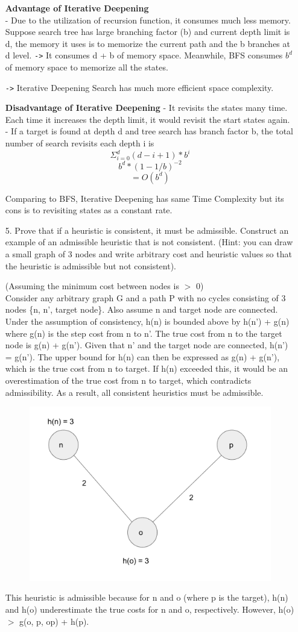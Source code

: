 \documentclass{article}
\begin{document}
\begin{enumerate}
\textbf{Advantage of Iterative Deepening}\\
- Due to the utilization of recursion function, it consumes much less memory.
Suppose search tree has large branching factor (b) and current depth limit is d, the memory it uses is to memorize the current path and the b branches at d level.
\verb|->| It consumes d + b of memory space.
Meanwhile, BFS consumes $b^d$ of memory space to memorize all the states.

\verb|->| Iterative Deepening Search has much more efficient space complexity.

\textbf{Disadvantage of Iterative Deepening}
- It revisits the states many time. Each time it increases the depth limit, it would revisit the start states again.\\
- If a target is found at depth d and tree search has branch factor b, the total number of search revisits each depth i is 
\[ \Sigma_{i=0}^d (d-i+1) \ast b^i \]
\[ b^d \ast (1 - 1/b)^{-2} \]
\[ = O(b^d)\]

Comparing to BFS, Iterative Deepening has same Time Complexity but its cons is to revisiting states as a constant rate.

\item[5.]
Prove that if a heuristic is consistent, it must be admissible. Construct an example of an admissible
heuristic that is not consistent. (Hint: you can draw a small graph of 3 nodes and write arbitrary cost and heuristic values
so that the heuristic is admissible but not consistent).

(Assuming the minimum cost between nodes is $>$ 0)\\
Consider any arbitrary graph G and a path P with no cycles consisting of 3 nodes \{n, n', target node\}.  Also assume n and target node are connected.  Under the assumption of consistency, h(n) is bounded above by h(n') + g(n) where g(n) is the step cost from n to n'.  The true cost from n to the target node is g(n) + g(n').  Given that n' and the target node are connected, h(n') = g(n').  The upper bound for h(n) can then be expressed as g(n) + g(n'), which is the true cost from n to target.  If h(n) exceeded this, it would be an overestimation of the true cost from n to target, which contradicts admissibility.  As a result, all consistent heuristics must be admissible.

\begin{figure}[h!]
    \centering
    \includegraphics[width=.4\linewidth]{graph.png}
    \caption{}
    \label{bidirectional}
\end{figure}

This heuristic is admissible because for n and o (where p is the target), h(n) and h(o) underestimate the true costs for n and o, respectively.  However, h(o) $>$ g(o, p, op) + h(p).

\end{enumerate}
\end{document}
